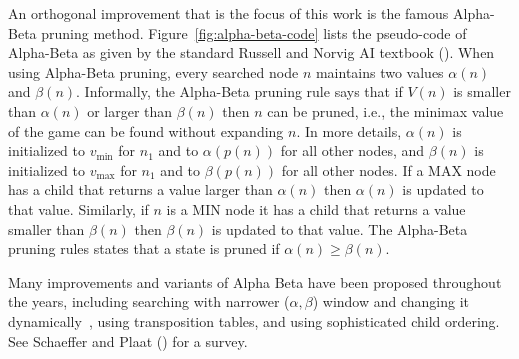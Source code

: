 \documentclass[runningheads]{llncs}
\newcommand{\MM}{\mathit{V}}
\newcommand{\vmax}{v_{\text{max}}}
\newcommand{\vmin}{v_{\text{min}}}
\newcommand{\rootnode}{\mathit{n_1}}
\begin{document}
An orthogonal improvement that is the focus of this work is the famous Alpha-Beta pruning method. 
Figure~\ref{fig:alpha-beta-code} lists the pseudo-code of Alpha-Beta as given by the standard Russell and Norvig AI textbook (\citeyear{russell2016artificial}). 
When using Alpha-Beta pruning, every searched node $n$ maintains two values $\alpha(n)$ and $\beta(n)$. 
Informally, the Alpha-Beta pruning rule says that if $\MM(n)$ is smaller than $\alpha(n)$ or larger than $\beta(n)$ then $n$ can be pruned, i.e., the minimax value of the game can be found without expanding $n$. In more details,  
$\alpha(n)$ is initialized to $\vmin$ for $\rootnode{}$ and to $\alpha(p(n))$ for all other nodes, and $\beta(n)$ is initialized to $\vmax$ for $\rootnode{}$ and to $\beta(p(n))$ for all other nodes. If a MAX node has a child that returns a value larger than $\alpha(n)$ then $\alpha(n)$ is updated to that value. Similarly, if $n$ is a MIN node it has a child that returns a value smaller than $\beta(n)$ then $\beta(n)$ is updated to that value. The Alpha-Beta pruning rules states that a state is pruned if $\alpha(n)\geq \beta(n)$.


Many improvements and variants of Alpha Beta have been proposed throughout the years, including searching with narrower ($\alpha, \beta$) window and changing it dynamically~\cite{pearl1980scout,reinefeld1983improvement}, using transposition tables, and using sophisticated child ordering. See
Schaeffer and Plaat (\citeyear{schaeffer1996new}) for a survey. 




\end{document}
